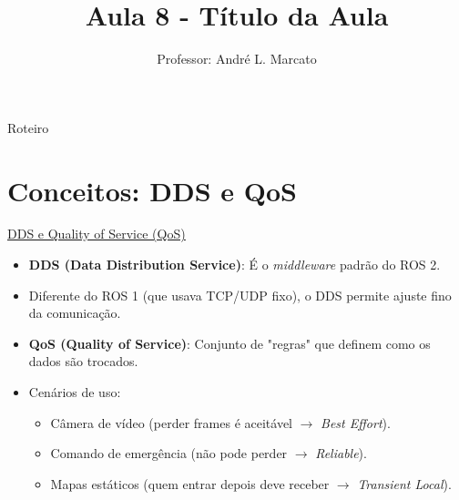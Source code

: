 \title[Aula 8]{Aula 8 - Título da Aula}
\author[Marcato]{Professor: André L. Marcato}

\begin{frame}
  \titlepage
\end{frame}

\begin{frame}{Roteiro}
\tableofcontents
\end{frame}

\section{Conceitos: DDS e QoS}

\begin{frame}[fragile]{\href{https://docs.ros.org/en/humble/Concepts/About-Quality-of-Service-Settings.html}{\uline{DDS e Quality of Service (QoS)}}}
  \begin{itemize}
    \item \textbf{DDS (Data Distribution Service)}: É o \textit{middleware} padrão do ROS 2.
    \item Diferente do ROS 1 (que usava TCP/UDP fixo), o DDS permite ajuste fino da comunicação.
    \item \textbf{QoS (Quality of Service)}: Conjunto de "regras" que definem como os dados são trocados.
    \item Cenários de uso:
      \begin{itemize}
        \item Câmera de vídeo (perder frames é aceitável $\rightarrow$ \textit{Best Effort}).
        \item Comando de emergência (não pode perder $\rightarrow$ \textit{Reliable}).
        \item Mapas estáticos (quem entrar depois deve receber $\rightarrow$ \textit{Transient Local}).
      \end{itemize}
  \end{itemize}
\end{frame}

